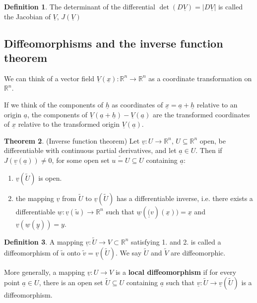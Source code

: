\documentclass[12pt,a4paper]{article}
\theoremstyle{definition}
\newtheorem{definition}{Definition}[subsection]
\newtheorem{theorem}[definition]{Theorem}
\begin{document}
\begin{definition}
	The determinant of the differential $\det (D\underline{V}) = |D\underline{V}|$ is called the Jacobian of $\underline{V}$, $J(\underline{V})$
\end{definition}

\subsection{Diffeomorphisms and the inverse function theorem}

We can think of a vector field $\underline{V}(\underline{x}): \mathbb{R}^n \rightarrow \mathbb{R}^n$ as a coordinate transformation on $\mathbb{R}^n$.

If we think of the components of $\underline{h}$ as coordinates of $\underline{x} = \underline{a} + \underline{h}$ relative to an origin $\underline{a}$, the components of $\underline{V}(\underline{a} + \underline{h}) - \underline{V}(\underline{a})$ are the transformed coordinates of $\underline{x}$ relative to the transformed origin $\underline{V}(\underline{a})$.

\begin{theorem}
	(Inverse function theorem) Let $\underline{v}: U \rightarrow \mathbb{R}^n$, $U \subseteq \mathbb{R}^n$ open, be differentiable with continuous partial derivatives, and let $\underline{a} \in U$. Then if $J(\underline{v}(\underline{a})) \ne 0$, for some open set $\tilde{u=U} \subseteq U$ containing $\underline{a}$:

	\begin{enumerate}
		\item $\underline{v}(\tilde{U})$ is open.
		\item the mapping $\underline{v}$ from $\tilde{U}$ to $\underline{v}(\tilde{U})$ has a differentiable inverse, i.e. there exists a differentiable $\underline{w}: \underline{v}(\tilde{u}) \rightarrow \mathbb{R}^n$ such that $\underline{w}(\underline(v)(\underline{x})) = \underline{x}$ and $\underline{v}(\underline{w}(\underline{y})) = y$.
	\end{enumerate}
\end{theorem}

\begin{definition}
	A mapping $\underline{v}: \tilde{U} \rightarrow V \subset \mathbb{R}^n$ satisfying 1. and 2. is called a diffeomorphism of $\tilde{u}$ onto $\tilde{v} = \underline{v}(\tilde{U})$. We say $\tilde{U}$ and $\tilde{V}$ are diffeomorphic.

	More generally, a mapping $\underline{v}: U \rightarrow V$ is a \textbf{local diffeomorphism} if for every point $\underline{a} \in U$, there is an open set $\tilde{U} \subseteq U$ containing $\underline{a}$ such that $\underline{v}: \tilde{U} \rightarrow \underline{v}(\tilde{U})$ is a diffeomorphism.
\end{definition}
\end{document}
